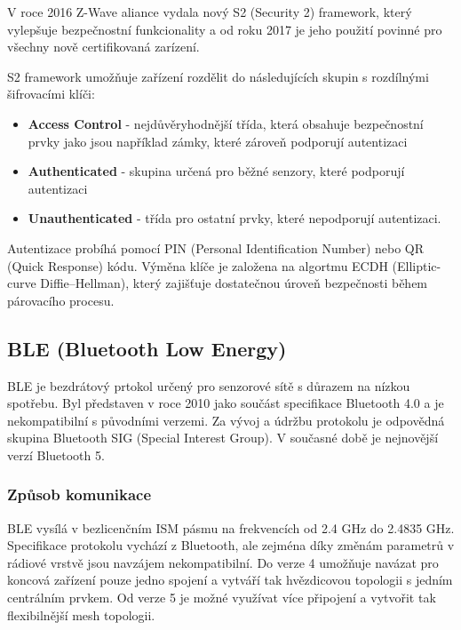  V roce 2016 Z-Wave aliance vydala nový S2 (Security 2) framework, který vylepšuje bezpečnostní funkcionality 
 a od roku 2017 je jeho použití povinné pro všechny nově certifikovaná zarízení. 
 
 S2 framework umožňuje zařízení rozdělit do následujících skupin s rozdílnými šifrovacími klíči:
 \begin{itemize}
  \item \textbf{Access Control} - 
   nejdůvěryhodnější třída, která obsahuje bezpečnostní prvky jako jsou například zámky,
   které zároveň podporují autentizaci
  \item \textbf{Authenticated} - 
  skupina určená pro běžné senzory, které podporují autentizaci 
  \item \textbf{Unauthenticated} - 
  třída pro ostatní prvky, které nepodporují autentizaci.
 \end{itemize}
 Autentizace probíhá pomocí PIN (Personal Identification Number) nebo QR (Quick Response) kódu.
 Výměna klíče je založena na algortmu ECDH (Elliptic-curve Diffie–Hellman), který zajišťuje 
 dostatečnou úroveň bezpečnosti během párovacího procesu. \cite{cesnet-survey}

 
  \subsection{BLE (Bluetooth Low Energy)}
  BLE je bezdrátový prtokol určený pro senzorové sítě s důrazem na nízkou spotřebu. Byl představen 
  v roce 2010 jako součást specifikace Bluetooth 4.0 a je nekompatibilní s původními verzemi. 
  Za vývoj a údržbu protokolu je odpovědná skupina Bluetooth SIG (Special Interest Group).
  V současné době je nejnovější verzí Bluetooth 5.
  
  \subsubsection{Způsob komunikace}
  BLE vysílá v bezlicenčním ISM pásmu na frekvencích od 2.4 GHz do 2.4835 GHz. Specifikace
  protokolu vychází z Bluetooth, ale zejména díky změnám parametrů v rádiové vrstvě 
  jsou navzájem nekompatibilní. Do verze 4 umožňuje navázat pro koncová zařízení pouze jedno spojení a 
  vytváří tak hvězdicovou topologii s jedním centrálním prvkem. Od verze 5 je možné využívat více připojení
  a vytvořit tak flexibilnější mesh topologii. 
  

